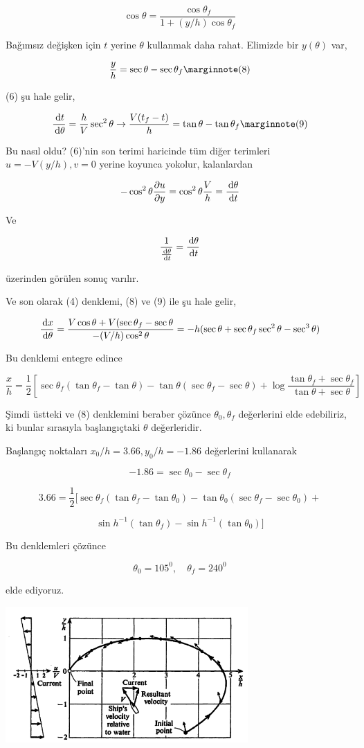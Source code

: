 \documentclass[12pt,fleqn]{article}\usepackage{../../common}
\begin{document}
$$
\cos\theta = \frac{\cos\theta_f}{1 + (y/h)\cos\theta_f} 
$$

Bağımsız değişken için $t$ yerine $\theta$ kullanmak daha
rahat. Elimizde bir $y(\theta)$ var, 

$$
\frac{y}{h} = \sec\theta - \sec\theta_f 
\mlabel{8}
$$

(6) şu hale gelir, 

$$
\frac{\ud t}{\ud \theta} = \frac{h}{V} \sec^2\theta \to
\frac{V(t_f-t)}{h} = \tan\theta - \tan\theta_f 
\mlabel{9}
$$

Bu nasıl oldu? (6)'nin son terimi haricinde tüm diğer 
terimleri $u = -V(y/h), v=0$ yerine koyunca yokolur, kalanlardan

$$
-\cos^2 \theta \frac{\partial u}{\partial y} = 
\cos^2 \theta \frac{V}{h}=\frac{\,\mathrm{d} \theta}{\,\mathrm{d} t}
$$

Ve

$$
\frac{1}{\frac{\,\mathrm{d} \theta}{\,\mathrm{d} t}} = \frac{\,\mathrm{d} \theta}{\,\mathrm{d} t}
$$

üzerinden görülen sonuç varılır. 

Ve son olarak (4) denklemi, (8) ve (9) ile şu hale gelir,

$$
\frac{\,\mathrm{d} x}{\,\mathrm{d} \theta} = 
\frac{V \cos\theta + V (\sec\theta_f - \sec\theta}{-(V/h)\cos^2\theta} =
-h (\sec\theta + \sec\theta_f \sec^2\theta - \sec^3\theta)
$$

Bu denklemi entegre edince

$$
\frac{x}{h} = \frac{1}{2} \left[
\sec\theta_f (\tan\theta_f - \tan\theta) - \tan\theta (\sec\theta_f - \sec\theta)
+ \log \frac{\tan\theta_f + \sec\theta_f}{\tan\theta + \sec\theta}
\right] 
$$


Şimdi üstteki ve (8) denklemini beraber çözünce $\theta_0,\theta_f$
değerlerini elde edebiliriz, ki bunlar sırasıyla başlangıçtaki
$\theta$ değerleridir. 


Başlangıç noktaları $x_0/h = 3.66, y_0/h = -1.86$ değerlerini kullanarak 

$$
-1.86 = \sec\theta_0 - \sec\theta_f 
$$

$$
3.66 = \frac{1}{2} [ \sec\theta_f (\tan\theta_f - \tan\theta_0 ) - 
\tan\theta_0 (\sec\theta_f - \sec\theta_0) + 
$$

$$
\sin h^{-1} (\tan\theta_f) - \sin h^{-1} (\tan\theta_0) ]
$$

Bu denklemleri çözünce 

$$
\theta_0 = 105^0, \quad \theta_f = 240^0
$$

elde ediyoruz. 

\includegraphics[width=25em]{phy_path_01.png}
\end{document}
